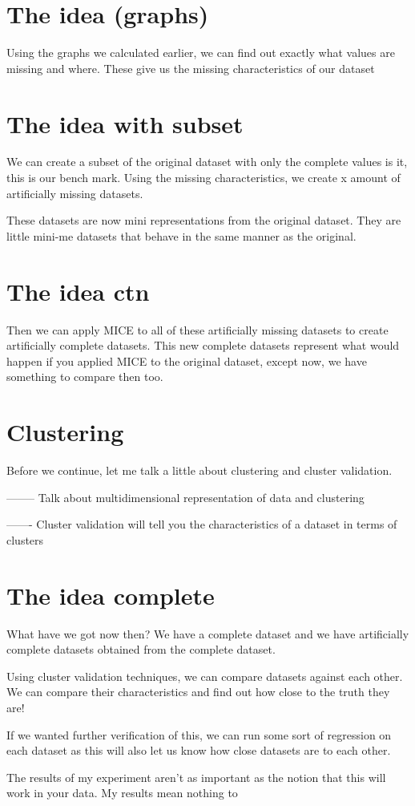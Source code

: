 \documentclass{report}
\begin{document}
\section*{The idea (graphs)}
Using the graphs we calculated earlier, we can find out exactly what values are missing and where. These give us the missing characteristics of our dataset

\section*{The idea with subset}
We can create a subset of the original dataset with only the complete values is it, this is our bench mark. Using the missing characteristics, we create x amount of artificially missing datasets. 

These datasets are now mini representations from the original dataset. They are little mini-me datasets that behave in the same manner as the original. 

\section*{The idea ctn}
Then we can apply MICE to all of these artificially missing datasets to create artificially complete datasets. This new complete datasets represent what would happen if you applied MICE to the original dataset, except now, we have something to compare then too. 

\section*{Clustering}
Before we continue, let me talk a little about clustering and cluster validation. 

-------- Talk about multidimensional representation of data and clustering

------- Cluster validation will tell you the characteristics of a dataset in terms of clusters

\section*{The idea complete}
What have we got now then? We have a complete dataset and we have artificially complete datasets obtained from the complete dataset. 

Using cluster validation techniques, we can compare datasets against each other. We can compare their characteristics and find out how close to the truth they are! 

If we wanted further verification of this, we can run some sort of regression on each dataset as this will also let us know how close datasets are to each other. 

The results of my experiment aren't as important as the notion that this will work in your data. My results mean nothing to 
\end{document}
